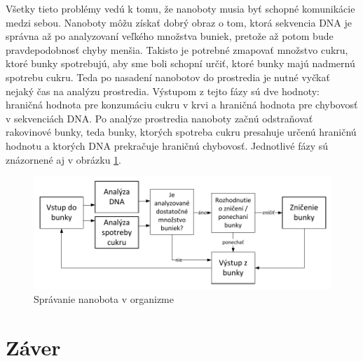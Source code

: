 \documentclass[10pt,twoside,slovak,a4paper]{article}
\begin{document}
Všetky tieto problémy vedú k tomu, že nanoboty musia byť schopné komunikácie medzi sebou. Nanoboty môžu získať dobrý obraz o tom, ktorá sekvencia DNA je správna až po analyzovaní veľkého množstva buniek, pretože až potom bude pravdepodobnosť chyby menšia. Takisto je potrebné zmapovať množstvo cukru, ktoré bunky spotrebujú, aby sme boli schopní určiť, ktoré bunky majú nadmernú spotrebu cukru. Teda po nasadení nanobotov do prostredia je nutné vyčkať nejaký čas na analýzu prostredia. Výstupom z tejto fázy sú dve hodnoty: hraničná hodnota pre konzumáciu cukru v krvi a hraničná hodnota pre chybovosť v sekvenciách DNA. Po analýze prostredia nanoboty začnú odstraňovať rakovinové bunky, teda bunky, ktorých spotreba cukru presahuje určenú hraničnú hodnotu a ktorých DNA prekračuje hraničnú chybovosť. Jednotlivé fázy sú znázornené aj v obrázku \ref{f:spravanie}.

\begin{figure}[tbh]
\label{f:spravanie}
\includegraphics[scale=0.9]{spravanie.pdf}
\caption{Správanie nanobota v organizme}
\end{figure}

\section{Záver}

\listoffigures


\end{document}
